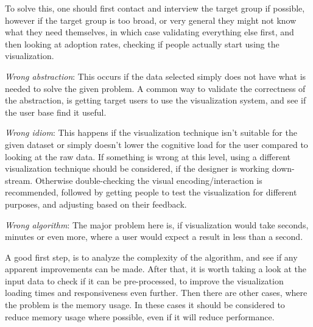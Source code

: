 \documentclass[Report.tex]{subfiles}
\begin{document}
	To solve this, one should first contact and interview the target group if possible, however if the target group is too broad, or very general they might not know what they need themselves, in which case validating everything else first, and then looking at adoption rates, checking if people actually start using the visualization.
	
	\emph{Wrong abstraction}: This occurs if the data selected simply does not have what is needed to solve the given problem. A common way to validate the correctness of the abstraction, is getting target users to use the visualization system, and see if the user base find it useful.
	
	 \emph{Wrong idiom}: This happens if the visualization technique isn't suitable for the given dataset or simply doesn't lower the cognitive load for the user compared to looking at the raw data. If something is wrong at this level, using a different visualization technique should be considered, if the designer is working down-stream. Otherwise double-checking the visual encoding/interaction is recommended, followed by getting people to test the visualization for different purposes, and adjusting based on their feedback.
	 
	 \emph{Wrong algorithm}: The major problem here is, if visualization would take seconds, minutes or even more, where a user would expect a result in less than a second. 
	 
	 A good first step, is to analyze the complexity of the algorithm, and see if any apparent improvements can be made. After that, it is worth taking a look at the input data to check if it can be pre-processed, to improve the visualization loading times and responsiveness even further. Then there are other cases, where the problem is the memory usage. In these cases it should be considered to reduce memory usage where possible, even if it will reduce performance.
\end{document}
